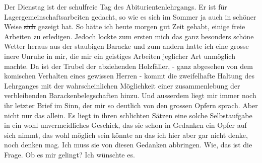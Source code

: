 \def\day{12. Oktober 1943.}
\mktitle

Der Dienstag ist der schulfreie Tag des Abiturientenlehrgangs.
Er ist f\"{u}r Lagergemeinschaftsarbeiten gedacht, so wie es sich im Sommer ja auch in sch\"{o}ner Weise \st{sich} gezeigt hat.
So h\"{a}tte ich heute morgen gut Zeit gehabt, einige freie Arbeiten zu erledigen.
Jedoch lockte zum ersten mich das ganz besonders sch\"{o}ne Wetter heraus aus der staubigen Baracke und zum andern hatte ich eine grosse inere Unruhe in mir, die mir ein geistiges Arbeiten jeglicher Art unm\"{o}glich machte.
Da ist der Trubel der abziehenden Holzf\"{a}ller, - ganz abgesehen von dem komischen Verhalten eines gewissen Herren - kommt die zweifelhafte Haltung des Lehrganges mit der wahrscheinlichen M\"{o}glichkeit einer zusammenlebung der verbleibenden Barackenbelegschaften hinzu.
Und ausserdem liegt mir immer noch ihr letzter Brief im Sinn, der mir so deutlich von den grossen Opfern sprach.
Aber nicht nur das allein.
Es liegt in ihren schlichten S\"{a}tzen eine solche Selbstaufgabe in ein wohl unvermeidliches Geschick, das sie schon in Gedanken ein Opfer auf sich nimmt, das wohl m\"{o}glich sein k\"{o}nnte an das ich hier aber gar nicht denke, noch denken mag.
Ich muss sie von diesen Gedanken abbringen.
Wie, das ist die Frage.
Ob es mir gelingt?
Ich w\"{u}nschte es.

\clearpage
